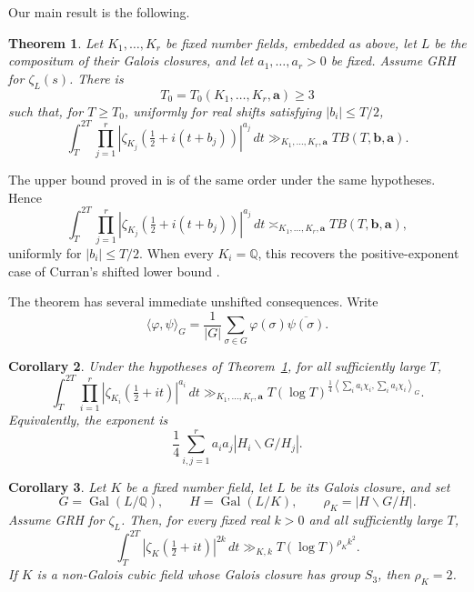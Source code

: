 \documentclass[11pt]{amsart}
\numberwithin{equation}{section}
\theoremstyle{plain}
\newtheorem{thm}{Theorem}
\newtheorem{cor}[thm]{Corollary}
\newcommand{\Q}{\mathbb{Q}}
\renewcommand{\le}{\leqslant}
\renewcommand{\ge}{\geqslant}
\DeclareMathOperator{\Gal}{Gal}
\begin{document}
Our main result is the following.

\begin{thm}\label{thm:main}
Let $K_1,\ldots,K_r$ be fixed number fields, embedded as above, let $L$ be
the compositum of their Galois closures, and let $a_1,\ldots,a_r>0$ be
fixed.  Assume GRH for $\zeta_L(s)$.  There is
$$
T_0=T_0(K_1,\ldots,K_r,\mathbf a)\ge3
$$
such that, for $T\ge T_0$, uniformly for real shifts satisfying
$|b_i|\le T/2$,
\begin{equation}\label{eq:main-lower-bound}
\int_T^{2T}\prod_{j=1}^r
\left|\zeta_{K_j}\left(\tfrac12+i(t+b_j)\right)\right|^{a_j}\,dt
\gg_{K_1,\ldots,K_r,\mathbf a}
T B(T,\mathbf b,\mathbf a).
\end{equation}
\end{thm}

The upper bound proved in \cite[Theorem~1.1]{DurkanKarakMahatab} is of the
same order under the same hypotheses.  Hence
\begin{equation}\label{eq:two-sided-order}
\int_T^{2T}\prod_{j=1}^r
\left|\zeta_{K_j}\left(\tfrac12+i(t+b_j)\right)\right|^{a_j}\,dt
\asymp_{K_1,\ldots,K_r,\mathbf a}
T B(T,\mathbf b,\mathbf a),
\end{equation}
uniformly for $|b_i|\le T/2$.  When every $K_i=\Q$, this recovers the
positive-exponent case of Curran's shifted lower bound
\cite[Theorem~1.1]{CurranLower}.

The theorem has several immediate unshifted consequences.  Write
$$
\langle\varphi,\psi\rangle_G
=\frac1{|G|}\sum_{\sigma\in G}
\varphi(\sigma)\overline{\psi(\sigma)}.
$$

\begin{cor}\label{cor:unshifted-mixed}
Under the hypotheses of Theorem~\ref{thm:main}, for all sufficiently large
$T$,
\begin{equation}\label{eq:unshifted-mixed}
\int_T^{2T}\prod_{i=1}^r
\left|\zeta_{K_i}\left(\tfrac12+it\right)\right|^{a_i}\,dt
\gg_{K_1,\ldots,K_r,\mathbf a}
T(\log T)^{\frac14
\left\langle\sum_i a_i\chi_i,\sum_i a_i\chi_i\right\rangle_G}.
\end{equation}
Equivalently, the exponent is
$$
\frac14\sum_{i,j=1}^r
a_i a_j |H_i\backslash G/H_j|.
$$
\end{cor}

\begin{cor}\label{cor:single-field}
Let $K$ be a fixed number field, let $L$ be its Galois closure, and set
$$
G=\Gal(L/\Q),\qquad H=\Gal(L/K),\qquad
\rho_K=|H\backslash G/H|.
$$
Assume GRH for $\zeta_L$.  Then, for every fixed real $k>0$ and all
sufficiently large $T$,
\begin{equation}\label{eq:single-field}
\int_T^{2T}
\left|\zeta_K\left(\tfrac12+it\right)\right|^{2k}\,dt
\gg_{K,k}
T(\log T)^{\rho_Kk^2}.
\end{equation}
If $K$ is a non-Galois cubic field whose Galois closure has group $S_3$,
then $\rho_K=2$.
\end{cor}
\end{document}

